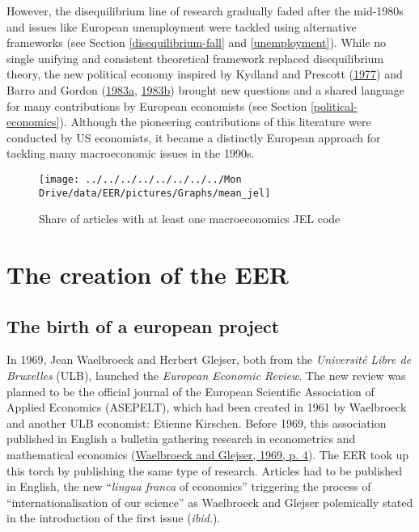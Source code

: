 \documentclass[
  12pt,
  onecolumn]{article}
\begin{document}
However, the disequilibrium line of research gradually faded after the
mid-1980s and issues like European unemployment were tackled using
alternative frameworks (see Section \ref{disequilibrium-fall} and
\ref{unemployment}). While no single unifying and consistent theoretical
framework replaced disequilibrium theory, the new political economy
inspired by Kydland and Prescott
(\protect\hyperlink{ref-kydland1977}{1977}) and Barro and Gordon
(\protect\hyperlink{ref-barro1983}{1983a},
\protect\hyperlink{ref-barro1983c}{1983b}) brought new questions and a
shared language for many contributions by European economists (see
Section \ref{political-economics}). Although the pioneering
contributions of this literature were conducted by US economists, it
became a distinctly European approach for tackling many macroeconomic
issues in the 1990s.

\begin{figure}[H]

{\centering \texttt{[image: ../../../../../../../../Mon Drive/data/EER/pictures/Graphs/mean\_jel]} 

}

\caption{Share of articles with at least one macroeconomics JEL code}\label{fig:plot-jel}
\end{figure}

\hypertarget{EER-creation}{%
\section{The creation of the EER}\label{EER-creation}}

\hypertarget{the-birth-of-a-european-project}{%
\subsection{The birth of a european
project}\label{the-birth-of-a-european-project}}

In 1969, Jean Waelbroeck and Herbert Glejser, both from the
\emph{Université Libre de Bruxelles} (ULB), launched the \emph{European
Economic Review}. The new review was planned to be the official journal
of the European Scientific Association of Applied Economics (ASEPELT),
which had been created in 1961 by Waelbroeck and another ULB economist:
Etienne Kirschen. Before 1969, this association published in English a
bulletin gathering research in econometrics and mathematical economics
(\protect\hyperlink{ref-waelbroeck1969}{Waelbroeck and Glejser, 1969, p.
4}). The EER took up this torch by publishing the same type of research.
Articles had to be published in English, the new ``\emph{lingua franca}
of economics'' triggering the process of ``internationalisation of our
science'' as Waelbroeck and Glejser polemically stated in the
introduction of the first issue (\emph{ibid.}).
\end{document}
